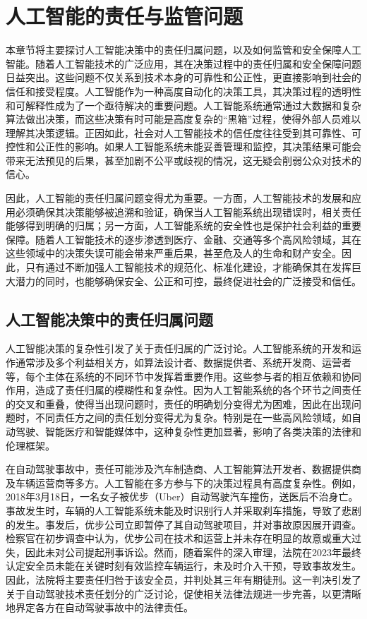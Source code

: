 \section{人工智能的责任与监管问题}
本章节将主要探讨人工智能决策中的责任归属问题，以及如何监管和安全保障人工智能。随着人工智能技术的广泛应用，其在决策过程中的责任归属和安全保障问题日益突出。这些问题不仅关系到技术本身的可靠性和公正性，更直接影响到社会的信任和接受程度。人工智能作为一种高度自动化的决策工具，其决策过程的透明性和可解释性成为了一个亟待解决的重要问题。人工智能系统通常通过大数据和复杂算法做出决策，而这些决策有时可能是高度复杂的“黑箱”过程，使得外部人员难以理解其决策逻辑。正因如此，社会对人工智能技术的信任度往往受到其可靠性、可控性和公正性的影响。如果人工智能系统未能妥善管理和监控，其决策结果可能会带来无法预见的后果，甚至加剧不公平或歧视的情况，这无疑会削弱公众对技术的信心。

因此，人工智能的责任归属问题变得尤为重要。一方面，人工智能技术的发展和应用必须确保其决策能够被追溯和验证，确保当人工智能系统出现错误时，相关责任能够得到明确的归属；另一方面，人工智能系统的安全性也是保护社会利益的重要保障。随着人工智能技术的逐步渗透到医疗、金融、交通等多个高风险领域，其在这些领域中的决策失误可能会带来严重后果，甚至危及人的生命和财产安全。因此，只有通过不断加强人工智能技术的规范化、标准化建设，才能确保其在发挥巨大潜力的同时，也能够确保安全、公正和可控，最终促进社会的广泛接受和信任。

\subsection{人工智能决策中的责任归属问题}
人工智能决策的复杂性引发了关于责任归属的广泛讨论。人工智能系统的开发和运作通常涉及多个利益相关方，如算法设计者、数据提供者、系统开发商、运营者等，每个主体在系统的不同环节中发挥着重要作用。这些参与者的相互依赖和协同作用，造成了责任归属的模糊性和复杂性。因为人工智能系统的各个环节之间责任的交叉和重叠，使得当出现问题时，责任的明确划分变得尤为困难，因此在出现问题时，不同责任方之间的责任划分变得尤为复杂。特别是在一些高风险领域，如自动驾驶、智能医疗和智能媒体中，这种复杂性更加显著，影响了各类决策的法律和伦理框架。


在自动驾驶事故中，责任可能涉及汽车制造商、人工智能算法开发者、数据提供商及车辆运营商等多方。人工智能在多方参与下的决策过程具有高度复杂性。例如，2018年3月18日，一名女子被优步（Uber）自动驾驶汽车撞伤，送医后不治身亡。事故发生时，车辆的人工智能系统未能及时识别行人并采取刹车措施，导致了悲剧的发生。事发后，优步公司立即暂停了其自动驾驶项目，并对事故原因展开调查。检察官在初步调查中认为，优步公司在技术和运营上并未存在明显的故意或重大过失，因此未对公司提起刑事诉讼。然而，随着案件的深入审理，法院在2023年最终认定安全员未能在关键时刻有效监控车辆运行，未及时介入干预，导致事故发生。因此，法院将主要责任归咎于该安全员，并判处其三年有期徒刑。这一判决引发了关于自动驾驶技术责任划分的广泛讨论，促使相关法律法规进一步完善，以更清晰地界定各方在自动驾驶事故中的法律责任。

